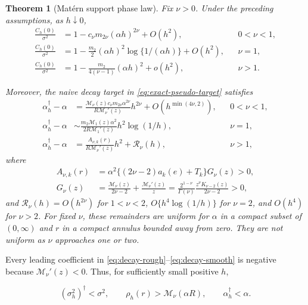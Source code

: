 \documentclass[11pt]{article}
\newtheorem{theorem}{Theorem}
\theoremstyle{remark}
\newcommand{\Matern}{\mathcal M}
\begin{document}
\begin{theorem}[Mat\'ern support phase law]
\label{thm:pseudo-range-phase}
Fix \(\nu>0\).  Under the preceding assumptions, as \(h\downarrow0\),
\begin{align}
  \frac{C_h(0)}{\sigma^2}
  & =1-c_\nu m_{2\nu}(\alpha h)^{2\nu}+O(h^2),
  &&0<\nu<1,\label{eq:variance-rough}\\
  \frac{C_h(0)}{\sigma^2}
  & =1-\frac{m_2}{2}(\alpha h)^2\log\{1/(\alpha h)\}+O(h^2),
  &&\nu=1,\label{eq:variance-threshold}\\
  \frac{C_h(0)}{\sigma^2}
  & =1-\frac{m_2}{4(\nu-1)}(\alpha h)^2+o(h^2),
  &&\nu>1.\label{eq:variance-smooth}
\end{align}

Moreover, the naive decay target in \eqref{eq:exact-pseudo-target} satisfies
\begin{align}
  \alpha_h^\dagger-\alpha
  & =
  \frac{\Matern_\nu(z)c_\nu m_{2\nu}\alpha^{2\nu}}
       {R\Matern_\nu'(z)}h^{2\nu}
  +O\!\left(h^{\min(4\nu,2)}\right),
  &&0<\nu<1,\label{eq:decay-rough}\\
  \alpha_h^\dagger-\alpha
  & \sim
  \frac{m_2\Matern_1(z)\alpha^2}
       {2R\Matern_1'(z)}h^2\log(1/h),
  &&\nu=1,\label{eq:decay-threshold}\\
  \alpha_h^\dagger-\alpha
  & =\frac{A_{\nu,k}(r)}{R\Matern_\nu'(z)}h^2+\mathcal R_\nu(h),
  &&\nu>1,\label{eq:decay-smooth}
\end{align}
where
\begin{align}
  A_{\nu,k}(r)
  &=\alpha^2\{(2\nu-2)a_k(e)+T_k\}G_\nu(z)>0,\\
  G_\nu(z)
  &=\frac{\Matern_\nu(z)}{2\nu-2}
    +\frac{\Matern_\nu'(z)}{z}
   =\frac{2^{1-\nu}}{\Gamma(\nu)}
     \frac{z^\nu K_{\nu-2}(z)}{2\nu-2}>0,
  \label{eq:G-positive}
\end{align}
and \(\mathcal R_\nu(h)=O(h^{2\nu})\) for \(1<\nu<2\),
\(O\{h^4\log(1/h)\}\) for \(\nu=2\), and \(O(h^4)\) for \(\nu>2\).
For fixed \(\nu\), these remainders are uniform for \(\alpha\) in a compact
subset of \((0,\infty)\) and \(r\) in a compact annulus bounded away from zero.
They are not uniform as \(\nu\) approaches one or two.
\end{theorem}

Every leading coefficient in
\eqref{eq:decay-rough}--\eqref{eq:decay-smooth} is negative because
\(\Matern_\nu'(z)<0\).  Thus, for sufficiently small positive \(h\),

\begin{equation}
  (\sigma_h^2)^\dagger<\sigma^2,\qquad
  \rho_h(r)>\Matern_\nu(\alpha R),\qquad
  \alpha_h^\dagger<\alpha.
  \label{eq:sign-conclusion}
\end{equation}
\end{document}
